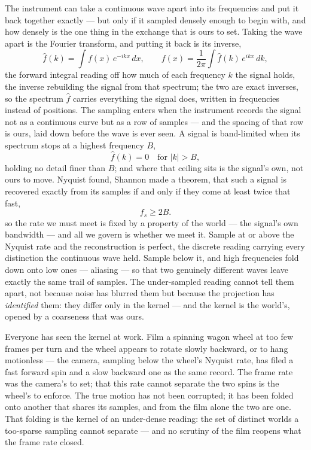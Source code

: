 The instrument can take a continuous wave apart into its frequencies and put it back together exactly --- but
only if it sampled densely enough to begin with, and how densely is the one thing in the exchange that is ours
to set. Taking the wave apart is the Fourier transform, and putting it back is its inverse,
\begin{equation}
  \hat f(k) = \int f(x)\, e^{-ikx}\, dx, \qquad f(x) = \frac{1}{2\pi}\int \hat f(k)\, e^{ikx}\, dk,
\end{equation}
the forward integral reading off how much of each frequency $k$ the signal holds, the inverse rebuilding the
signal from that spectrum; the two are exact inverses, so the spectrum $\hat f$ carries everything the signal
does, written in frequencies instead of positions. The sampling enters when the instrument records the signal
not as a continuous curve but as a row of samples --- and the spacing of that row is ours, laid down before
the wave is ever seen. A signal is band-limited when its spectrum stops at a highest frequency $B$,
\begin{equation}
  \hat f(k) = 0 \quad\text{for } |k| > B,
\end{equation}
holding no detail finer than $B$; and where that ceiling sits is the signal's own, not ours to move. Nyquist
found, Shannon made a theorem, that such a signal is recovered exactly from its samples if and only if they
come at least twice that fast,
\begin{equation}
  f_s \geq 2B .
\end{equation}
so the rate we must meet is fixed by a property of the world --- the signal's own bandwidth --- and all we
govern is whether we meet it. Sample at or above the Nyquist rate and the reconstruction is perfect, the
discrete reading carrying every distinction the continuous wave held. Sample below it, and high frequencies
fold down onto low ones --- aliasing --- so that two genuinely different waves leave exactly the same trail of
samples. The under-sampled reading cannot tell them apart, not because noise has blurred them but because the
projection has \emph{identified} them: they differ only in the kernel --- and the kernel is the world's,
opened by a coarseness that was ours.

Everyone has seen the kernel at work. Film a spinning wagon wheel at too few frames per turn and the wheel
appears to rotate slowly backward, or to hang motionless --- the camera, sampling below the wheel's Nyquist
rate, has filed a fast forward spin and a slow backward one as the same record. The frame rate was the
camera's to set; that this rate cannot separate the two spins is the wheel's to enforce. The true motion has
not been corrupted; it has been folded onto another that shares its samples, and from the film alone the two
are one. That folding is the kernel of an under-dense reading: the set of distinct worlds a too-sparse
sampling cannot separate --- and no scrutiny of the film reopens what the frame rate closed.


